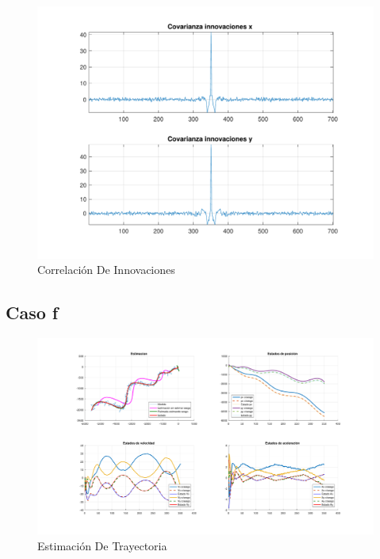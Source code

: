 	\begin{figure}[H]
		\centering
		\includegraphics[width=1.0\textwidth,keepaspectratio]{Figuras/covinn_ej4e.pdf}
		\caption{Correlación De Innovaciones}
		\label{fig:ej4e_cov}
	\end{figure}


\subsection{Caso f}

	\begin{figure}[H]
		\centering
		\includegraphics[width=1.0\textwidth,keepaspectratio]{Figuras/graf_ej4f.pdf}
		\caption{Estimación De Trayectoria}
		\label{fig:ej3f}
	\end{figure}
	
